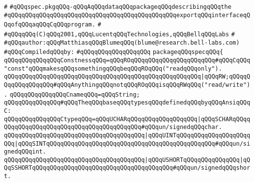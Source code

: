 \label{src/app/c-glue-maker/spec.pkg}
\verb|#|\newline
\verb|#qQQqspec.pkgqQQq-qQQqAqQQqdataqQQqpackageqQQqdescribingqQQqthe|\newline
\verb|#qQQqqQQqqQQqqQQqqQQqqQQqqQQqqQQqqQQqqQQqqQQqqQQqexportqQQqinterfaceqQQqofqQQqaqQQqCqQQqprogram.|\newline
\verb|#|\newline
\verb|#qQQqqQQq(C)qQQq2001,qQQqLucentqQQqTechnologies,qQQqBellqQQqLabs|\newline
\verb|#|\newline
\verb|#qQQqauthor:qQQqMatthiasqQQqBlumeqQQq(blume@research.bell-labs.com)|\newline
\newline
\verb|#qQQqCompiledqQQqby:|\newline
\verb|#qQQqqQQqqQQqqQQqqQQq|\newline
\newline
\verb|packageqQQqspecqQQq{|\newline
\newline
\newline
\verb|qQQqqQQqqQQqqQQqConstnessqQQq=qQQqROqQQqqQQqqQQqqQQqqQQqqQQq#qQQqCqQQq"const"qQQqmakesqQQqsomethingqQQqbeqQQqROqQQq("readqQQqonly").|\newline
\verb|qQQqqQQqqQQqqQQqqQQqqQQqqQQqqQQqqQQqqQQqqQQqqQQqqQQqqQQq|\verb#|qQQqRW;qQQqqQQqqQQqqQQqqQQq#\verb|#qQQqAnythingqQQqnotqQQqROqQQqisqQQqRWqQQq("read/write").|\newline
\newline
\verb|qQQqqQQqqQQqqQQqCnameqQQq=qQQqString;|\newline
\newline
\newline
\newline
\verb|qQQqqQQqqQQqqQQq#qQQqTheqQQqbaseqQQqtypesqQQqdefinedqQQqbyqQQqAnsiqQQqC:|\newline
\newline
\verb|qQQqqQQqqQQqqQQqCtypeqQQq=qQQqUCHARqQQqqQQqqQQqqQQqqQQq|\verb#|qQQqSCHARqQQqqQQqqQQqqQQqqQQqqQQqqQQqqQQqqQQqqQQqqQQq#\verb|#qQQqun/signedqQQqchar.|\newline
\verb|qQQqqQQqqQQqqQQqqQQqqQQqqQQqqQQqqQQqqQQq|\verb#|qQQqUINTqQQqqQQqqQQqqQQqqQQqqQQq|qQQqSINTqQQqqQQqqQQqqQQqqQQqqQQqqQQqqQQqqQQqqQQqqQQqqQQq#\verb|#qQQqun/signedqQQqint.|\newline
\verb|qQQqqQQqqQQqqQQqqQQqqQQqqQQqqQQqqQQqqQQq|\verb#|qQQqUSHORTqQQqqQQqqQQqqQQq|qQQqSSHORTqQQqqQQqqQQqqQQqqQQqqQQqqQQqqQQqqQQqqQQq#\verb|#qQQqun/signedqQQqshort.|\newline
